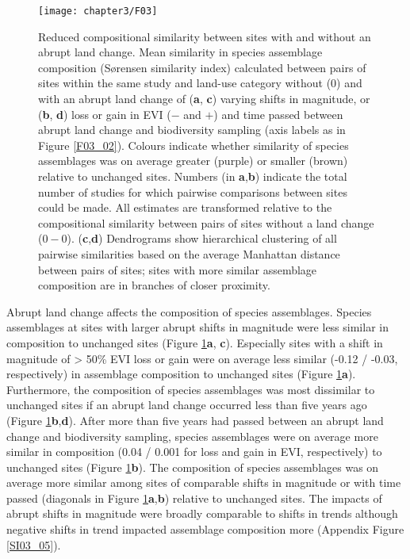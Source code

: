 \begin{figure}[hb]
\centering
\texttt{[image: chapter3/F03]}
\caption{Reduced compositional similarity between sites with and without an abrupt land change. Mean similarity in species assemblage composition (S\o rensen similarity index) calculated between pairs of sites within the same study and land-use category without ($0$) and with an abrupt land change of (\textbf{a}, \textbf{c}) varying shifts in magnitude, or (\textbf{b}, \textbf{d}) loss or gain in EVI ($-$ and $+$) and time passed between abrupt land change and biodiversity sampling (axis labels as in Figure \ref{F03_02}). Colours indicate whether similarity of species assemblages was on average greater (purple) or smaller (brown) relative to unchanged sites. Numbers (in \textbf{a},\textbf{b}) indicate the total number of studies for which pairwise comparisons between sites could be made. All estimates are transformed relative to the compositional similarity between pairs of sites without a land change ($0 - 0$). (\textbf{c},\textbf{d}) Dendrograms show hierarchical clustering of all pairwise similarities based on the average Manhattan distance between pairs of sites; sites with more similar assemblage composition are in branches of closer proximity. }
\label{F03_03}
\end{figure}

Abrupt land change affects the composition of species assemblages. Species assemblages at sites with larger abrupt shifts in magnitude were less similar in composition to unchanged sites (Figure \ref{F03_03}\textbf{a}, \textbf{c}). Especially sites with a shift in magnitude of > 50\% EVI loss or gain were on average less similar (-0.12 / -0.03, respectively) in assemblage composition to unchanged sites (Figure \ref{F03_03}\textbf{a}). Furthermore, the composition of species assemblages was most dissimilar to unchanged sites if an abrupt land change occurred less than five years ago (Figure \ref{F03_03}\textbf{b},\textbf{d}). After more than five years had passed between an abrupt land change and biodiversity sampling, species assemblages were on average more similar in composition (0.04 / 0.001 for loss and gain in EVI, respectively) to unchanged sites (Figure \ref{F03_03}\textbf{b}). The composition of species assemblages was on average more similar among sites of comparable shifts in magnitude or with time passed (diagonals in Figure \ref{F03_03}\textbf{a},\textbf{b}) relative to unchanged sites. The impacts of abrupt shifts in magnitude were broadly comparable to shifts in trends although negative shifts in trend impacted assemblage composition more (Appendix Figure \ref{SI03_05}).

